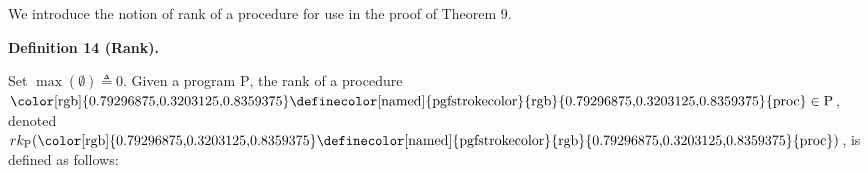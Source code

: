  
We introduce the notion of rank of a procedure for use in the proof of Theorem 9.\par
 
 
 
\par\medskip\noindent\textbf{Definition 14 (Rank).}\par
 
 
Set $\max(\emptyset)\triangleq 0$. Given a program $\mathrm{P}$, the rank of a procedure $\text{\color[rgb]{0.79296875,0.3203125,0.8359375}\definecolor[named]{%
pgfstrokecolor}{rgb}{0.79296875,0.3203125,0.8359375}{{proc}}}\in\mathrm{P}{}$, denoted $rk_{\mathrm{P}}(\text{\color[rgb]{0.79296875,0.3203125,0.8359375}\definecolor[%
named]{pgfstrokecolor}{rgb}{0.79296875,0.3203125,0.8359375}{{proc}}})$, is defined as follows:\par
 
 

